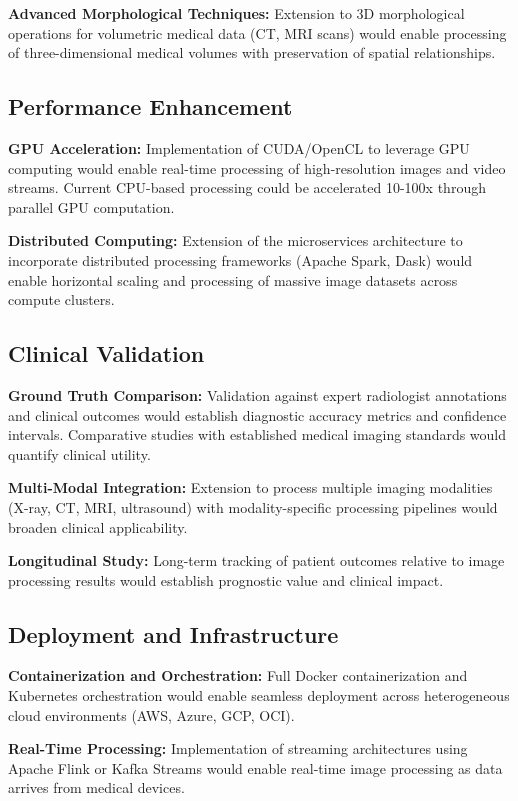 \documentclass[12pt,a4paper]{article}
\begin{document}
\textbf{Advanced Morphological Techniques:} Extension to 3D morphological operations for volumetric medical data (CT, MRI scans) would enable processing of three-dimensional medical volumes with preservation of spatial relationships.

\subsection{Performance Enhancement}

\textbf{GPU Acceleration:} Implementation of CUDA/OpenCL to leverage GPU computing would enable real-time processing of high-resolution images and video streams. Current CPU-based processing could be accelerated 10-100x through parallel GPU computation.

\textbf{Distributed Computing:} Extension of the microservices architecture to incorporate distributed processing frameworks (Apache Spark, Dask) would enable horizontal scaling and processing of massive image datasets across compute clusters.

\subsection{Clinical Validation}

\textbf{Ground Truth Comparison:} Validation against expert radiologist annotations and clinical outcomes would establish diagnostic accuracy metrics and confidence intervals. Comparative studies with established medical imaging standards would quantify clinical utility.

\textbf{Multi-Modal Integration:} Extension to process multiple imaging modalities (X-ray, CT, MRI, ultrasound) with modality-specific processing pipelines would broaden clinical applicability.

\textbf{Longitudinal Study:} Long-term tracking of patient outcomes relative to image processing results would establish prognostic value and clinical impact.

\subsection{Deployment and Infrastructure}

\textbf{Containerization and Orchestration:} Full Docker containerization and Kubernetes orchestration would enable seamless deployment across heterogeneous cloud environments (AWS, Azure, GCP, OCI).

\textbf{Real-Time Processing:} Implementation of streaming architectures using Apache Flink or Kafka Streams would enable real-time image processing as data arrives from medical devices.
\end{document}
